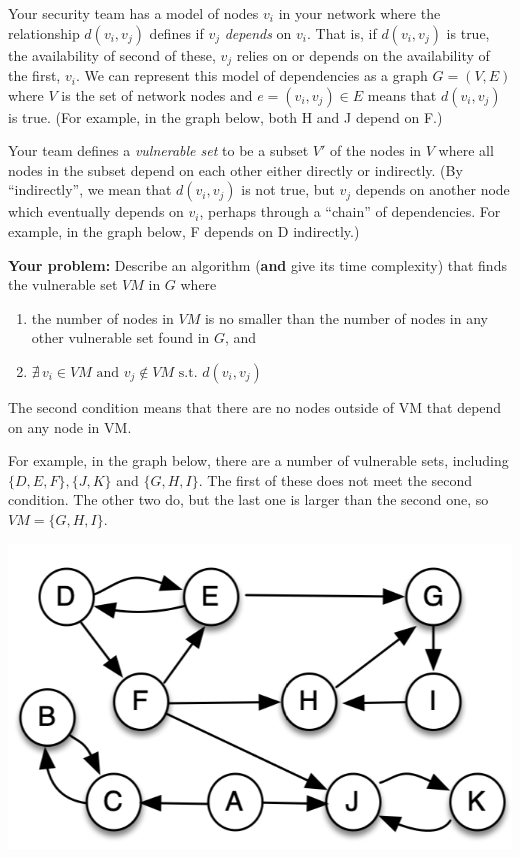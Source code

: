 \documentclass[10pt]{article}
\begin{document}
Your security team has a model of nodes $v_i$ in your network where the relationship $d(v_i, v_j)$ defines if $v_j$ \emph{depends} on $v_i$. That is, if $d(v_i, v_j)$ is true,  the availability of second of these, $v_j$ relies on or depends on the availability of the first, $v_i$. We can represent this model of dependencies as a graph $G=(V,E)$ where $V$ is the set of network nodes and $e=(v_i, v_j) \in E$ means that $d(v_i, v_j)$ is true.  (For example, in the graph below, both H and J depend on F.)

Your team defines a \emph{vulnerable set} to be a subset $V'$ of the nodes in $V$ where all nodes in the subset depend on each other either directly or indirectly. (By ``indirectly'', we mean that $d(v_i, v_j)$ is not true, but $v_j$ depends on another node which eventually depends on $v_i$, perhaps through a ``chain'' of dependencies. For example, in the graph below, F depends on D indirectly.) 

\textbf{Your problem:}  Describe an algorithm (\textbf{and} give its time complexity) that finds the vulnerable set $VM$ in $G$ where 
\begin{enumerate}
\item the number of nodes in $VM$ is no smaller than the number of nodes in any other vulnerable set found in $G$, and
\item $\nexists \, v_i \in VM \textrm{ and } v_j \notin VM \textrm{ s.t. } d(v_i, v_j)$
\end{enumerate}
The second condition means that there are no nodes outside of VM that depend on any node in VM.

For example, in the graph below, there are a number of vulnerable sets, including $\{D, E, F\}, \{J, K\}$ and $\{G, H, I\}$.   The first of these does not meet the second condition. The other two do, but the last one is larger than the second one, so $VM=\{G, H, I\}$.

 
 \includegraphics[width = 0.4\columnwidth]{vulnerable-sets.png}
\end{document}

